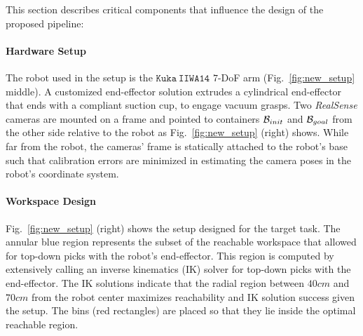 This section describes critical components that influence the design of the proposed pipeline:

\paragraph{Hardware Setup}
The robot used in the setup is the $\mathtt{Kuka\ IIWA14}$ $7$-DoF arm (Fig.~\ref{fig:new_setup} middle). A customized end-effector solution extrudes a cylindrical end-effector that ends with a compliant suction cup, to engage vacuum grasps. Two \textit{RealSense}  cameras are mounted on a frame and pointed to containers $\mathcal{B}_{init}$ and $\mathcal{B}_{goal}$ from the other side relative to the robot as Fig.~\ref{fig:new_setup} (right) shows. While far from the robot, the cameras' frame is statically attached to the robot's base such that calibration errors are minimized in estimating the camera poses in the robot's coordinate system. 


\paragraph{Workspace Design}
Fig.~\ref{fig:new_setup} (right) shows the setup designed for the target task. The annular blue region represents the subset of the reachable workspace that allowed for top-down picks with the robot's end-effector. This region is computed by extensively calling an inverse kinematics (IK) solver for top-down picks with the end-effector. The IK solutions indicate that the radial region between $40cm$ and $70cm$ from the robot center maximizes reachability and IK solution success given the setup.  The bins (red rectangles) are placed so that they lie inside the optimal reachable region. 




